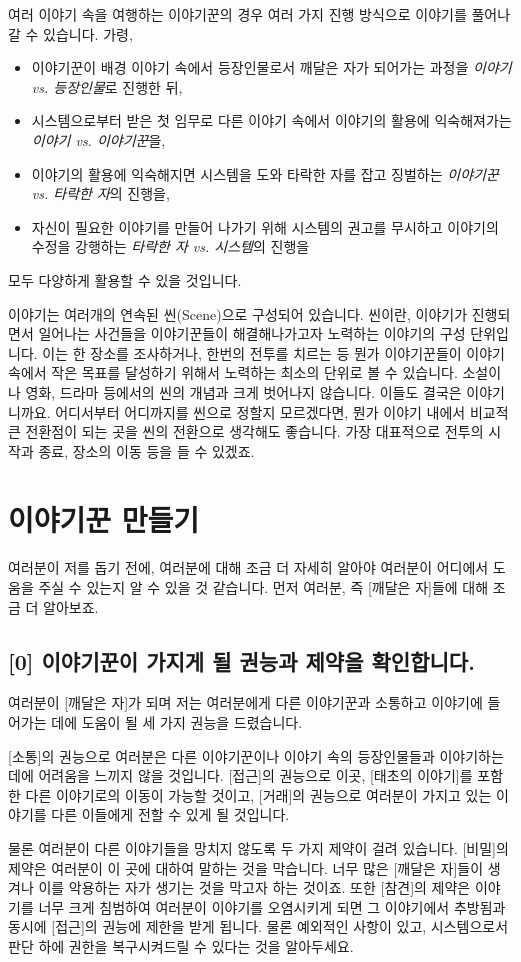 \documentclass[12pt]{report}
\newcommand{\world}[1]{{\nanumpen \large #1 \par}\bigskip}
\begin{document}
	여러 이야기 속을 여행하는 이야기꾼의 경우 여러 가지 진행 방식으로 이야기를 풀어나갈 수 있습니다. 가령,
	\begin{itemize}
		\item 이야기꾼이 배경 이야기 속에서 등장인물로서 깨달은 자가 되어가는 과정을 \emph{이야기 vs. 등장인물}로 진행한 뒤,
		\item 시스템으로부터 받은 첫 임무로 다른 이야기 속에서 이야기의 활용에 익숙해져가는 \emph{이야기 vs. 이야기꾼}을,
		\item 이야기의 활용에 익숙해지면 시스템을 도와 타락한 자를 잡고 징벌하는 \emph{이야기꾼 vs. 타락한 자}의 진행을,
		\item 자신이 필요한 이야기를 만들어 나가기 위해 시스템의 권고를 무시하고 이야기의 수정을 강행하는 \emph{타락한 자 vs. 시스템}의 진행을
	\end{itemize}
	모두 다양하게 활용할 수 있을 것입니다.
	
	\bigskip
	
	이야기는 여러개의 연속된 씬(Scene)으로 구성되어 있습니다. 씬이란, 이야기가 진행되면서 일어나는 사건들을 이야기꾼들이 해결해나가고자 노력하는 이야기의 구성 단위입니다. 이는 한 장소를 조사하거나, 한번의 전투를 치르는 등 뭔가 이야기꾼들이 이야기 속에서 작은 목표를 달성하기 위해서 노력하는 최소의 단위로 볼 수 있습니다. 소설이나 영화, 드라마 등에서의 씬의 개념과 크게 벗어나지 않습니다. 이들도 결국은 이야기니까요. 어디서부터 어디까지를 씬으로 정할지 모르겠다면, 뭔가 이야기 내에서 비교적 큰 전환점이 되는 곳을 씬의 전환으로 생각해도 좋습니다. 가장 대표적으로 전투의 시작과 종료, 장소의 이동 등을 들 수 있겠죠.
	
	\chapter{이야기꾼 만들기}
	\world{여러분이 저를 돕기 전에, 여러분에 대해 조금 더 자세히 알아야 여러분이 어디에서 도움을 주실 수 있는지 알 수 있을 것 같습니다. 먼저 여러분, 즉 [깨달은 자]들에 대해 조금 더 알아보죠.}
	
	\section*{[0] 이야기꾼이 가지게 될 권능과 제약을 확인합니다.}\label{권능_제약}
	\world{여러분이 [깨달은 자]가 되며 저는 여러분에게 다른 이야기꾼과 소통하고 이야기에 들어가는 데에 도움이 될 세 가지 권능을 드렸습니다.}
	\world{[소통]의 권능으로 여러분은 다른 이야기꾼이나 이야기 속의 등장인물들과 이야기하는데에 어려움을 느끼지 않을 것입니다. [접근]의 권능으로 이곳, [태초의 이야기]를 포함한 다른 이야기로의 이동이 가능할 것이고, [거래]의 권능으로 여러분이 가지고 있는 이야기를 다른 이들에게 전할 수 있게 될 것입니다.}
	\world{물론 여러분이 다른 이야기들을 망치지 않도록 두 가지 제약이 걸려 있습니다. [비밀]의 제약은 여러분이 이 곳에 대하여 말하는 것을 막습니다. 너무 많은 [깨달은 자]들이 생겨나 이를 악용하는 자가 생기는 것을 막고자 하는 것이죠. 또한 [참견]의 제약은 이야기를 너무 크게 침범하여 여러분이 이야기를 오염시키게 되면 그 이야기에서 추방됨과 동시에 [접근]의 권능에 제한을 받게 됩니다. 물론 예외적인 사항이 있고, 시스템으로서 판단 하에 권한을 복구시켜드릴 수 있다는 것을 알아두세요.}
	
\end{document}
